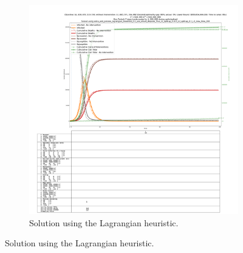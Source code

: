 \documentclass{article}
\begin{document}
\begin{figure}[H]\ContinuedFloat
    \begin{subfigure}{\textwidth}
        \begin{center}
            \includegraphics[width=1.2\linewidth]{figures/heuristic_solutions/system_state_vs_time_T100_baron__solve_and_process_lagrangian_threshold_0.1_use_smart_stepsize_True_L1_optGap_0.025_L2_optGap_0.1_L2_max_time_200.pdf}
        \end{center}
        \caption{Solution using the Lagrangian heuristic.}\label{fig:heuristic_lagrangian}
    \end{subfigure}
\end{figure}
\end{document}
